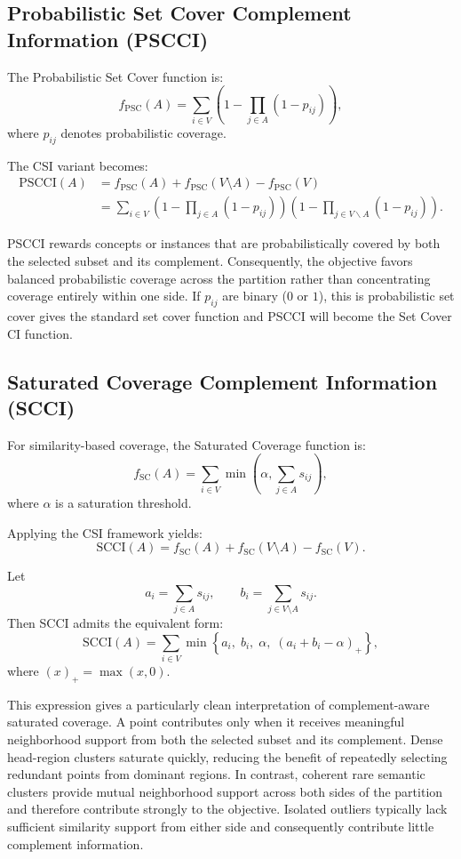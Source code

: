 \documentclass[11pt]{article}
\begin{document}
\subsection{Probabilistic Set Cover Complement Information (PSCCI)}

The Probabilistic Set Cover function is:
\[
f_{\text{PSC}}(A)
=
\sum_{i\in V}
\left(
1-
\prod_{j\in A}(1-p_{ij})
\right),
\]
where $p_{ij}$ denotes probabilistic coverage.

The CSI variant becomes:
\begin{align}
\text{PSCCI}(A)
&=
f_{\text{PSC}}(A)
+
f_{\text{PSC}}(V\setminus A)
-
f_{\text{PSC}}(V)
\nonumber \\
&=
\sum_{i\in V}
\left(
1-\prod_{j\in A}(1-p_{ij})
\right)
\left(
1-\prod_{j\in V \backslash A}(1-p_{ij})
\right).
\end{align}

PSCCI rewards concepts or instances that are probabilistically covered by both the selected subset and its complement. Consequently, the objective favors balanced probabilistic coverage across the partition rather than concentrating coverage entirely within one side. If $p_{ij}$ are binary ($0$ or $1$), this is probabilistic set cover gives the standard set cover function and PSCCI will become the Set Cover CI function. 

\subsection{Saturated Coverage Complement Information (SCCI)}

For similarity-based coverage, the Saturated Coverage function is:
\[
f_{\text{SC}}(A)
=
\sum_{i\in V}
\min\left(
\alpha,\sum_{j\in A}s_{ij}
\right),
\]
where $\alpha$ is a saturation threshold.

Applying the CSI framework yields:
\[
\text{SCCI}(A)
=
f_{\text{SC}}(A)
+
f_{\text{SC}}(V\setminus A)
-
f_{\text{SC}}(V).
\]

Let
\[
a_i=\sum_{j\in A}s_{ij},
\qquad
b_i=\sum_{j\in V\setminus A}s_{ij}.
\]
Then SCCI admits the equivalent form:
\[
\text{SCCI}(A)
=
\sum_{i\in V}
\min\left\{
a_i,\;
b_i,\;
\alpha,\;
(a_i+b_i-\alpha)_+
\right\},
\]
where $(x)_+ = \max(x,0)$.

This expression gives a particularly clean interpretation of complement-aware saturated coverage. A point contributes only when it receives meaningful neighborhood support from both the selected subset and its complement. Dense head-region clusters saturate quickly, reducing the benefit of repeatedly selecting redundant points from dominant regions. In contrast, coherent rare semantic clusters provide mutual neighborhood support across both sides of the partition and therefore contribute strongly to the objective. Isolated outliers typically lack sufficient similarity support from either side and consequently contribute little complement information.
\end{document}

